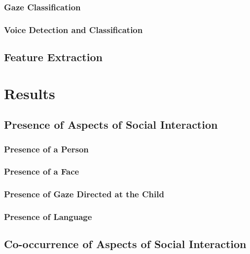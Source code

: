 \documentclass[
  man,floatsintext]{apa6}
\begin{document}
\subsubsection{Gaze Classification}\label{gaze-classification}

\subsubsection{Voice Detection and Classification}\label{voice-detection-and-classification}

\subsection{Feature Extraction}\label{feature-extraction}

\section{Results}\label{results}

\subsection{Presence of Aspects of Social Interaction}\label{presence-of-aspects-of-social-interaction}

\subsubsection{Presence of a Person}\label{presence-of-a-person}

\subsubsection{Presence of a Face}\label{presence-of-a-face}

\subsubsection{Presence of Gaze Directed at the Child}\label{presence-of-gaze-directed-at-the-child}

\subsubsection{Presence of Language}\label{presence-of-language}

\subsection{Co-occurrence of Aspects of Social Interaction}\label{co-occurrence-of-aspects-of-social-interaction}
\end{document}
